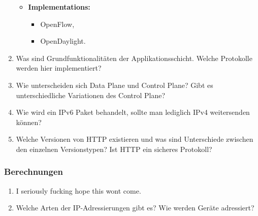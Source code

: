\documentclass{scrartcl}
\begin{document}
\begin{enumerate}
\begin{itemize}
            \item \textbf{Implementations:}
            \begin{itemize}
                \item OpenFlow,
                \item OpenDaylight.
            \end{itemize}
        \end{itemize}
        \item Was sind Grundfunktionalitäten der Applikationsschicht. Welche Protokolle werden hier implementiert?
        \item Wie unterscheiden sich Data Plane und Control Plane? Gibt es unterschiedliche Variationen des Control Plane?
        \item Wie wird ein IPv6 Paket behandelt, sollte man lediglich IPv4 weitersenden können?
        \item Welche Versionen von HTTP existieren und was sind Unterschiede zwischen den einzelnen Versionstypen? Ist HTTP ein sicheres Protokoll?
    \end{enumerate}
    \subsubsection{Berechnungen}
    \begin{enumerate}
        \item I seriously fucking hope this wont come.
        \item Welche Arten der IP-Adressierungen gibt es? Wie werden Geräte adressiert? %
    \end{enumerate}
\end{document}

